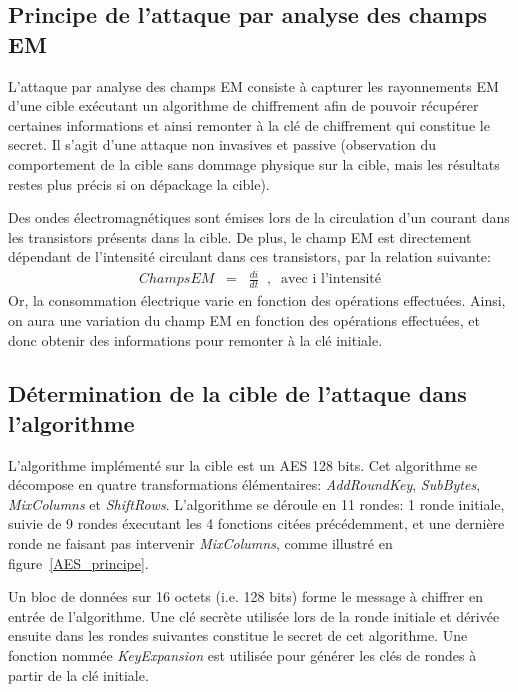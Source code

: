 \documentclass[a4paper, 12pt]{article}
\begin{document}
	\subsection{Principe de l'attaque par analyse des champs EM}
	L'attaque par analyse des champs EM consiste à capturer les rayonnements EM d'une cible exécutant un algorithme de chiffrement afin de pouvoir récupérer certaines informations et ainsi remonter à la clé de chiffrement qui constitue le secret. Il s'agit d'une attaque non invasives et passive (observation du comportement de la cible sans dommage physique sur la cible, mais les résultats restes plus précis si on dépackage la cible). 
	
	Des ondes électromagnétiques sont émises lors de la circulation d'un courant dans les transistors présents dans la cible. De plus, le champ EM est directement dépendant de l'intensité circulant dans ces transistors, par la relation suivante:
	\begin{align*}
		Champs EM \;\; = \;\; \frac{di}{dt} \;\; , \;\; \textrm{avec i l'intensité}
	\end{align*}
Or, la consommation électrique varie en fonction des opérations effectuées. Ainsi, on aura une variation du champ EM en fonction des opérations effectuées, et donc obtenir des informations pour remonter à la clé initiale. 

	\subsection{Détermination de la cible de l'attaque dans l'algorithme}
	L'algorithme implémenté sur la cible est un AES 128 bits. Cet algorithme se décompose en quatre transformations élémentaires: \emph{AddRoundKey}, \emph{SubBytes}, \emph{MixColumns} et \emph{ShiftRows}. L'algorithme se déroule en 11 rondes: 1 ronde initiale, suivie de 9 rondes éxecutant les 4 fonctions citées précédemment, et une dernière ronde ne faisant pas intervenir \emph{MixColumns}, comme illustré en figure~\ref{AES_principe}.
	
	Un bloc de données sur 16 octets (i.e. 128 bits) forme le message à chiffrer en entrée de l'algorithme. Une clé secrète utilisée lors de la ronde initiale et dérivée ensuite dans les rondes suivantes constitue le secret de cet algorithme. Une fonction nommée \emph{KeyExpansion} est utilisée pour générer les clés de rondes à partir de la clé initiale. 
\end{document}
